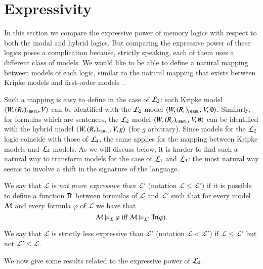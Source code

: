 \section{Expressivity}\label{expressivity}

In this section we compare the expressive power of memory logics
with respect to both the modal and hybrid logics.
But comparing the expressive power of these logics poses a complication
because, strictly speaking, each of them uses a different class of models.
We would like to be able to define a natural mapping between models
of each logic, similar to the natural mapping that exists between
Kripke models and first-order models~\cite{BRV01}.

Such a mapping is easy to define in the case of $\mathcal{L}_2$: each
Kripke model $\langle W,(R_r)_{r \in \textsc{rel}},V \rangle$ can be identified with the $\mathcal{L}_2$
model $\diam{W,\rels,$ $V,$ $\emptyset}$. Similarly, for formulas
which are sentences, the $\mathcal{L}_2$ model $\diam{W,$ \linebreak
$\rels,$ $V,\emptyset}$ can be identified with the hybrid model
$\langle W,(R_r)_{r \in \textsc{rel}},V,g \rangle$ (for $g$ arbitrary).
%
Since models for the $\mathcal{L}_2$ logic coincide with those of
$\mathcal{L}_4$, the same applies for the mapping between Kripke models
and $\mathcal{L}_4$ models.
%
As we will discuss below, it is harder to find such a natural way to
transform models for the case of $\mathcal{L}_1$ and $\mathcal{L}_3$: the most
natural way seems to involve a shift in the signature of the
language.

\begin{defn}
We say that
$\mathcal{L}$ is \emph{not more expressive than} $\mathcal{L'}$
(notation $\mathcal{L} \le \mathcal{L'}$) if it is possible to
define a function ${\sf Tr}$ between formulas of  $\mathcal{L}$ and $\mathcal{L'}$
such that for every model $\mathcal{M}$ and every formula $\varphi$ of $\mathcal{L}$
we have that
\[
\mathcal{M} \models_\mathcal{L} \varphi \mbox{ iff } \mathcal{M} \models_{\mathcal{L}'} {\sf Tr}(\varphi).
\]

We say that $\mathcal{L}$ is strictly less expressive than $\mathcal{L'}$
(notation $\mathcal{L} < \mathcal{L'}$) if $\mathcal{L} \le \mathcal{L'}$ but
not $\mathcal{L}' \le \mathcal{L}$.
\end{defn}


We now give some results related to the expressive power of
$\mathcal{L}_2$.

